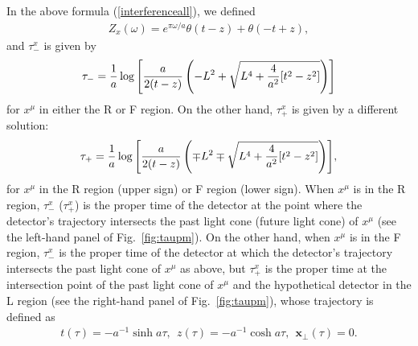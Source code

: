 \documentclass[aps,prd,preprintnumbers,nofootinbib,showpacs]{revtex4}%
\begin{document}
\begin{widetext}
In the above formula (\ref{interferenceall}), we defined 
\begin{eqnarray}
Z_x(\omega)=e^{\pi\omega/a}\theta(t-z)+\theta(-t+z),
\label{defZx}
\end{eqnarray}
and $\tau_-^x$ is given by 
\begin{eqnarray}
\tau_-={{1\over a}\log\left[{a\over 2(t-z)}\left(-L^2+\sqrt{L^4+{4\over a^2}[t^2-z^2]}
\right)\right]}
\label{deftaum}
\end{eqnarray}
for $x^\mu$ in either the R or F region. 
On the other hand, $\tau_+^x$ is given by a different solution:
\begin{eqnarray}
\tau_+=
{{1\over a}\log\left[{a\over 2(t-z)}\left(\mp L^2 \mp \sqrt{L^4+{4\over a^2}[t^2-z^2]}
\right)\right]}, 
\label{deftaup}
\end{eqnarray}
for $x^\mu$ in the R region (upper sign) or F region (lower sign). 
When $x^\mu$ is in the R region, $\tau_-^x$ ($\tau_+^x$) is the proper time of the 
detector at the point where the detector's trajectory intersects the 
past light cone (future light cone) of $x^\mu$ (see the left-hand panel of Fig.~\ref{fig:taupm}). 
On the other hand, when $x^\mu$ is in the F region, $\tau_-^x$ is 
the proper time of the detector at which the detector's trajectory intersects 
the past light cone of $x^\mu$ as above, but
$\tau_+^x$ is 
the proper time at the intersection point of the past light cone
of $x^\mu$ and the
hypothetical detector in the L region (see the right-hand panel of Fig.~\ref{fig:taupm}),
whose trajectory is defined as 
\begin{eqnarray}
t(\tau)=-a^{-1}\sinh a\tau, \  ~z(\tau)=-a^{-1}\cosh a\tau, \  ~\bm x_\perp(\tau)=0.
\label{trajecL}
\end{eqnarray}


\end{widetext}
\end{document}
